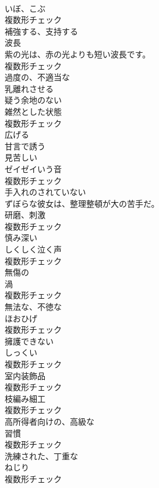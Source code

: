 \documentclass[8pt]{extreport}
\begin{document}
\begin{CJK}{UTF8}{min}
\\	[名詞]	いぼ、こぶ	
\\	複数形チェック
\\	[動詞]	補強する、支持する	
\\	[名詞]	波⻑	
\\	紫の光は、赤の光よりも短い波長です。	
\\	複数形チェック
\\	[形容詞]	過度の、不適当な	
\\	[動詞]	乳離れさせる	
\\	[形容詞]	疑う余地のない	
\\	[名詞]	雑然とした状態	
\\	複数形チェック
\\	[動詞]	広げる	
\\	[動詞]	甘言で誘う	
\\	[形容詞]	見苦しい	
\\	[名詞]	ゼイゼイいう音	
\\	複数形チェック
\\	[形容詞]	手入れのされていない	
\\	ずぼらな彼女は、整理整頓が大の苦手だ。	
\\	[名詞]	研磨、刺激	
\\	複数形チェック
\\	[形容詞]	慎み深い	
\\	[名詞]	しくしく泣く声	
\\	複数形チェック
\\	[形容詞]	無傷の	
\\	[名詞]	渦	
\\	複数形チェック
\\	[形容詞]	無法な、不徳な	
\\	[名詞]	ほおひげ	
\\	複数形チェック
\\	[形容詞]	擁護できない	
\\	[名詞]	しっくい	
\\	複数形チェック
\\	[名詞]	室内装飾品	
\\	複数形チェック
\\	[名詞]	枝編み細工	
\\	複数形チェック
\\	[形容詞]	高所得者向けの、高級な	
\\	[名詞]	習慣	
\\	複数形チェック
\\	[形容詞]	洗練された、丁重な	
\\	[名詞]	ねじり	
\\	複数形チェック

\end{CJK}
\end{document}

